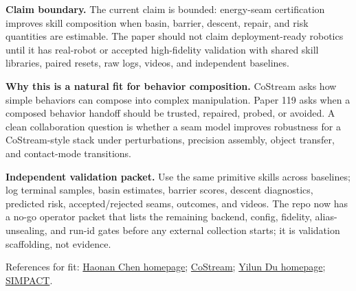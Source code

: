 \documentclass[10pt]{article}
\begin{document}
\textbf{Claim boundary.}
The current claim is bounded: energy-seam certification improves skill composition when basin, barrier, descent, repair, and risk quantities are estimable. The paper should not claim deployment-ready robotics until it has real-robot or accepted high-fidelity validation with shared skill libraries, paired resets, raw logs, videos, and independent baselines.

\textbf{Why this is a natural fit for behavior composition.}
CoStream asks how simple behaviors can compose into complex manipulation. Paper 119 asks when a composed behavior handoff should be trusted, repaired, probed, or avoided. A clean collaboration question is whether a seam model improves robustness for a CoStream-style stack under perturbations, precision assembly, object transfer, and contact-mode transitions.

\textbf{Independent validation packet.}
Use the same primitive skills across baselines; log terminal samples, basin estimates, barrier scores, descent diagnostics, predicted risk, accepted/rejected seams, outcomes, and videos. The repo now has a no-go operator packet that lists the remaining backend, config, fidelity, alias-unsealing, and run-id gates before any external collection starts; it is validation scaffolding, not evidence.

\vfill
References for fit: \href{https://haonan16.github.io/}{Haonan Chen homepage}; \href{https://arxiv.org/abs/2606.26423}{CoStream}; \href{https://yilundu.github.io/}{Yilun Du homepage}; \href{https://arxiv.org/abs/2512.05955}{SIMPACT}.
\end{document}
